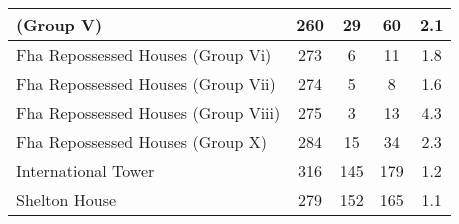 {\begin{tabular}{l|c|c|c|c|}
(Group V)}        & 260                                                   & 29                                                           & 60                                                                & 2.1                                                                \\ \hline\multicolumn{1}{|l|}{\cellcolor{ccteallight}Fha Repossessed Houses (Group Vi)}        & 273                                                   & 6                                                           & 11                                                                & 1.8                                                                \\ \hline\multicolumn{1}{|l|}{\cellcolor{ccteallight}Fha Repossessed Houses (Group Vii)}        & 274                                                   & 5                                                           & 8                                                                & 1.6                                                                \\ \hline\multicolumn{1}{|l|}{\cellcolor{ccteallight}Fha Repossessed Houses (Group Viii)}        & 275                                                   & 3                                                           & 13                                                                & 4.3                                                                \\ \hline\multicolumn{1}{|l|}{\cellcolor{ccteallight}Fha Repossessed Houses (Group X)}        & 284                                                   & 15                                                           & 34                                                                & 2.3                                                                \\ \hline\multicolumn{1}{|l|}{\cellcolor{ccteallight}International Tower}        & 316                                                   & 145                                                           & 179                                                                & 1.2                                                                \\ \hline\multicolumn{1}{|l|}{\cellcolor{ccteallight}Shelton House}        & 279                                                   & 152                                                           & 165                                                                & 1.1                                                                \\ \hline
    \end{tabular}
    }
    